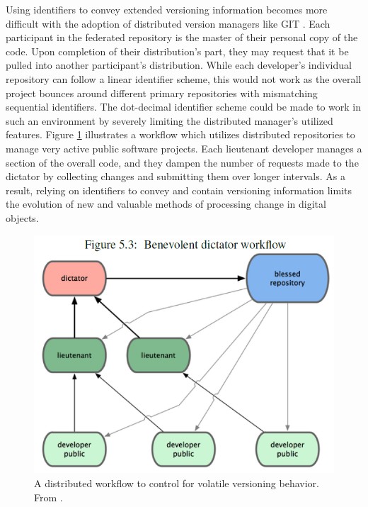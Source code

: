 Using identifiers to convey extended versioning information becomes more difficult with the adoption of distributed version managers like GIT \cite{cederqvist2002version}.
Each participant in the federated repository is the master of their personal copy of the code.
Upon completion of their distribution's part, they may request that it be pulled into another participant's distribution.
While each developer's individual repository can follow a linear identifier scheme, this would not work as the overall project bounces around different primary repositories with mismatching sequential identifiers.
The dot-decimal identifier scheme could be made to work in such an environment by severely limiting the distributed manager's utilized features.
Figure \ref{fig:federated} illustrates a workflow which utilizes distributed repositories to manage very active public software projects.
Each lieutenant developer manages a section of the overall code, and they dampen the number of requests made to the dictator by collecting changes and submitting them over longer intervals.
As a result, relying on identifiers to convey and contain versioning information limits the evolution of new and valuable methods of processing change in digital objects.

\begin{figure}
	\centering
	\includegraphics[scale=0.85]{figures/federatedGit.png}
	\caption[A distributed workflow to control for volatile versioning behavior.]{A distributed workflow to control for volatile versioning behavior.  From  \cite{cederqvist2002version}.}
	\label{fig:federated}
\end{figure}


